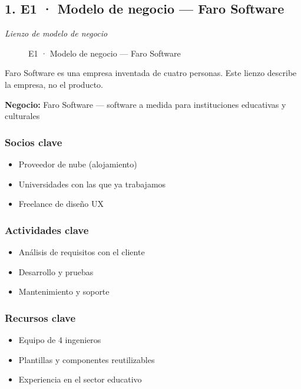 \subsection*{1. E1 · Modelo de negocio — Faro Software}

\emph{Lienzo de modelo de negocio}

\begin{figure}[H]
\centering
{}
\caption{E1 · Modelo de negocio — Faro Software}
\end{figure}

Faro Software es una empresa inventada de cuatro personas. Este lienzo describe la empresa, no el producto.

\textbf{Negocio:} Faro Software — software a medida para instituciones educativas y culturales

\subsubsection*{Socios clave}

\begin{itemize}
\item Proveedor de nube (alojamiento)
\item Universidades con las que ya trabajamos
\item Freelance de diseño UX
\end{itemize}

\subsubsection*{Actividades clave}

\begin{itemize}
\item Análisis de requisitos con el cliente
\item Desarrollo y pruebas
\item Mantenimiento y soporte
\end{itemize}

\subsubsection*{Recursos clave}

\begin{itemize}
\item Equipo de 4 ingenieros
\item Plantillas y componentes reutilizables
\item Experiencia en el sector educativo
\end{itemize}

